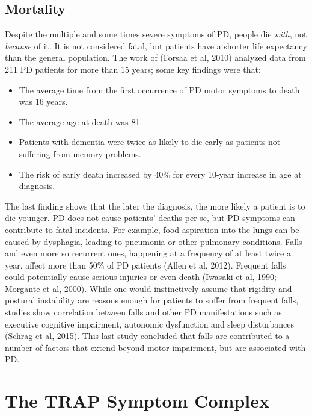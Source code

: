 
\subsection{Mortality}
\label{subsec:mortality}
Despite the multiple and some times severe symptoms of \gls{PD}, people die \textit{with}, not \textit{because} of it. It is not considered fatal, but patients have a shorter life expectancy than the general population. The work of (Forsaa et al, 2010) analyzed data from 211 \gls{PD} patients for more than 15 years; some key findings were that:
\begin{itemize}
\item The average time from the first occurrence of \gls{PD} motor symptoms to death was 16 years. 
\item The average age at death was 81.
\item Patients with dementia were twice as likely to die early as patients not suffering from memory problems.
\item The risk of early death increased by 40\% for every 10-year increase in age at diagnosis.
\end{itemize}
The last finding shows that the later the diagnosis, the more likely a patient is to die younger. \gls{PD} does not cause patients' deaths per se, but \gls{PD} symptoms can contribute to fatal incidents. For example, food aspiration into the lungs can be caused by dysphagia, leading to pneumonia or other pulmonary conditions. Falls and even more so recurrent ones, happening at a frequency of at least twice a year, affect more than 50\% of \gls{PD} patients (Allen et al, 2012). Frequent falls could potentially cause serious injuries or even death (Iwasaki et al, 1990; Morgante et al, 2000). While one would instinctively assume that rigidity and postural instability are reasons enough for patients to suffer from frequent falls, studies show correlation between falls and other \gls{PD} manifestations such as executive cognitive impairment, autonomic dysfunction and sleep disturbances (Schrag et al, 2015). This last study concluded that falls are contributed to a number of factors that extend beyond motor impairment, but are associated with \gls{PD}. 


\section{The TRAP Symptom Complex}
\label{sec:trap}
